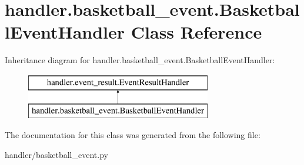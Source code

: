 \hypertarget{classhandler_1_1basketball__event_1_1_basketball_event_handler}{}\section{handler.\+basketball\+\_\+event.\+Basketball\+Event\+Handler Class Reference}
\label{classhandler_1_1basketball__event_1_1_basketball_event_handler}
Inheritance diagram for handler.\+basketball\+\_\+event.\+Basketball\+Event\+Handler\+:\begin{figure}[H]
\begin{center}
\leavevmode
\includegraphics[height=2.000000cm]{classhandler_1_1basketball__event_1_1_basketball_event_handler}
\end{center}
\end{figure}


The documentation for this class was generated from the following file\+:\begin{DoxyCompactItemize}
\item 
handler/basketball\+\_\+event.\+py\end{DoxyCompactItemize}

